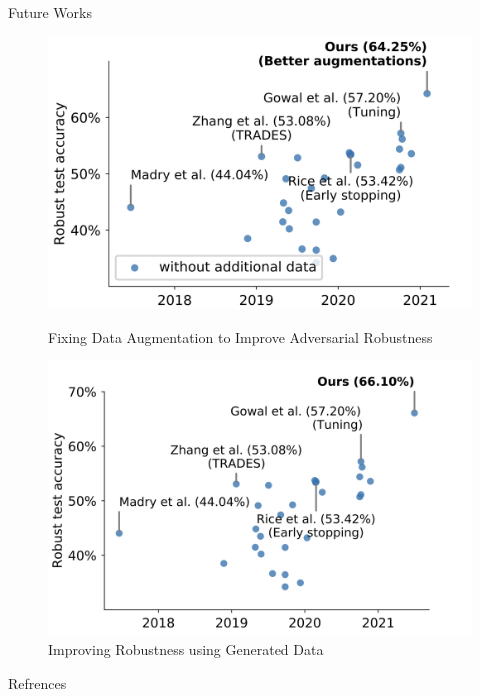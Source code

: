 \begin{frame}{Future Works}
    \begin{figure}
        \begin{minipage}{.45\textwidth}
            \centering
            \includegraphics[width=\linewidth]{pic/oct 21.png}
            \caption{Fixing Data Augmentation to Improve Adversarial Robustness}
            \label{fig:oct21}
        \end{minipage}
        \begin{minipage}{.45\textwidth}
            \centering
            \includegraphics[width=\linewidth]{pic/dec 21.png}
            \caption{Improving Robustness using Generated Data}
            \label{fig:dec21}
        \end{minipage}
    \end{figure}
    
\end{frame}

\begin{frame}{Refrences}
    
    
    \nocite{*}
\end{frame}

